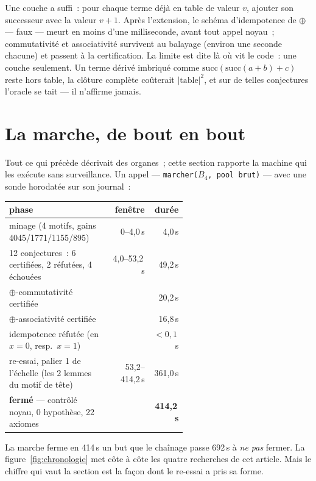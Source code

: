 \documentclass[11pt]{article}
\theoremstyle{remark}\newtheorem{remarque}{Remarque}
\begin{document}
Une couche a suffi~: pour chaque terme déjà en table de valeur $v$, ajouter
son successeur avec la valeur $v+1$. Après l'extension, le schéma
d'idempotence de $\oplus$ --- faux --- meurt en moins d'une milliseconde,
avant tout appel noyau~; commutativité et associativité survivent au balayage
(environ une seconde chacune) et passent à la certification. La limite est
dite là où vit le code~: une couche seulement. Un terme dérivé imbriqué comme
$\mathrm{succ}(\mathrm{succ}(a+b)+c)$ reste hors table, la clôture complète
coûterait $|\text{table}|^2$, et sur de telles conjectures l'oracle se tait
--- il n'affirme jamais.

\section{La marche, de bout en bout}
\label{sec:marche}

Tout ce qui précède décrivait des organes~; cette section rapporte la machine
qui les exécute sans surveillance. Un appel --- \texttt{marcher($B_4$, pool
brut)} --- avec une sonde horodatée sur son journal~:

\begin{center}\small
\begin{tabular}{@{}L{0.58\linewidth}rr@{}}
\toprule
phase & fenêtre & durée \\
\midrule
minage (4 motifs, gains 4045/1771/1155/895) & 0--4,0\,s & 4,0\,s \\
12 conjectures~: 6 certifiées, 2 réfutées, 4 échouées & 4,0--53,2\,s & 49,2\,s \\
\quad $\oplus$-commutativité certifiée & & 20,2\,s \\
\quad $\oplus$-associativité certifiée & & 16,8\,s \\
\quad idempotence réfutée (en $x=0$, resp.\ $x=1$) & & ${<}0,1$\,s \\
re-essai, palier 1 de l'échelle (les 2 lemmes du motif de tête) & 53,2--414,2\,s & 361,0\,s \\
\midrule
\textbf{fermé} --- contrôlé noyau, 0 hypothèse, 22 axiomes & & \textbf{414,2\,s} \\
\bottomrule
\end{tabular}
\end{center}

La marche ferme en 414\,s un but que le chaînage passe 692\,s à \emph{ne pas}
fermer. La figure~\ref{fig:chronologie} met côte à côte les quatre recherches
de cet article. Mais le chiffre qui vaut la section est la façon dont le
re-essai a pris sa forme.
\end{document}
